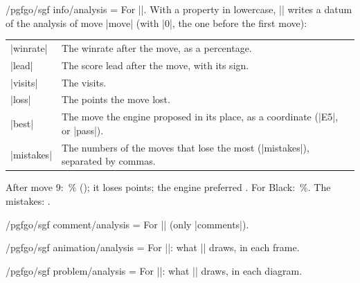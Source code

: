\begin{key}{/pgfgo/sgf info/analysis = }
	For |\sgfinfo|. With a property in lowercase, |\sgfinfo| writes a datum of the analysis of move |move| (with |0|, the one before the first move):

	\begin{center}
		\small
		\begin{tabular}{lp{9cm}}
			|winrate| & The winrate after the move, as a percentage. \\
			|lead| & The score lead after the move, with its sign. \\
			|visits| & The visits. \\
			|loss| & The points the move lost. \\
			|best| & The move the engine proposed in its place, as a coordinate (|E5|, or |pass|). \\
			|mistakes| & The numbers of the moves that lose the most (|mistakes|), separated by commas. \\
		\end{tabular}
	\end{center}

	\begin{codeexample}[]
		After move 9: \,\%
		(); it loses
		 points; the engine
		preferred . For Black:
		\,\%.
		The mistakes: .
	\end{codeexample}
\end{key}

\begin{key}{/pgfgo/sgf comment/analysis = }
	For |\sgfcomment| (only |comments|).
\end{key}

\begin{key}{/pgfgo/sgf animation/analysis = }
	For |\sgfanimation|: what |\sgf| draws, in each frame.
\end{key}

\begin{key}{/pgfgo/sgf problem/analysis = }
	For |\sgfproblem|: what |\sgf| draws, in each diagram.
\end{key}

